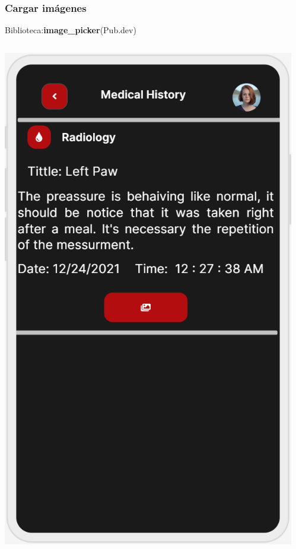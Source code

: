 \documentclass[14pt]{beamer}
\begin{document}
\begin{frame}
\frametitle{Cargar imágenes}
Biblioteca:\textbf{image\_picker}(Pub.dev)
\begin{columns}
\begin{column}{0.5\textwidth}
\begin{center}

\includegraphics[scale = 0.48]{Images/History.PNG}

\end{center}
\end{column}
\begin{column}{0.5\textwidth}
\begin{center}


\end{center}
\end{column}
\end{columns}
\end{frame}
\end{document}
